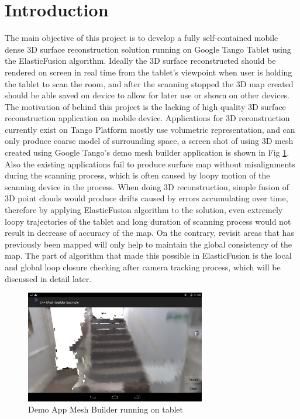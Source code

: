\documentclass[12pt,twoside]{article}
\begin{document}
\section{Introduction}
The main objective of this project is to develop a fully self-contained mobile dense 3D surface reconstruction solution running on Google Tango Tablet using the ElasticFusion algorithm. Ideally the 3D surface reconstructed should be rendered on screen in real time from the tablet's viewpoint when user is holding the tablet to scan the room, and after the scanning stopped the 3D map created should be able saved on device to allow for later use or shown on other devices. The motivation of behind this project is the lacking of high quality 3D surface reconstruction application on mobile device. Applications for 3D reconstruction currently exist on Tango Platform mostly use volumetric representation, and can only produce coarse model of surrounding space, a screen shot of using 3D mesh created using Google Tango's demo mesh builder application is shown in Fig \ref{fig:ScreenshotTango5}. Also the existing applications fail to produce surface map without misalignments during the scanning process, which is often caused by loopy motion of the scanning device in the process. When doing 3D reconstruction, simple fusion of 3D point clouds would produce drifts caused by errors accumulating over time, therefore by applying ElasticFusion algorithm to the solution, even extremely loopy trajectories of the tablet and long duration of scanning process would not result in decrease of accuracy of the map. On the contrary, revisit areas that has previously been mapped will only help to maintain the global consistency of the map. The part of algorithm that made this possible in ElasticFusion is the local and   global loop closure checking after camera tracking process, which will be discussed in detail later.\\
\begin{figure}[h]
    \centering
    \includegraphics[width=0.7\textwidth]{figures/ScreenshotTango5}
    \caption{Demo App Mesh Builder running on tablet}
    \label{fig:ScreenshotTango5}
\end{figure}
\end{document}
